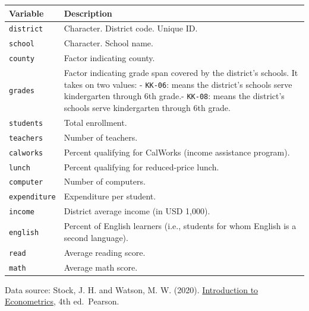 \documentclass[
  12pt,
  letterpaper,
]{scrbook}
\theoremstyle{plain}
\theoremstyle{definition}
\theoremstyle{remark}
\begin{document}
\begin{longtable}[]{@{}
  >{\raggedright\arraybackslash}p{}
  >{\raggedright\arraybackslash}p{}@{}}
\toprule\noalign{}
\begin{minipage}[b]{\linewidth}\raggedright
Variable
\end{minipage} & \begin{minipage}[b]{\linewidth}\raggedright
Description
\end{minipage} \\
\midrule\noalign{}
\endhead
\bottomrule\noalign{}
\endlastfoot
\texttt{district} & Character. District code. Unique ID. \\
\texttt{school} & Character. School name. \\
\texttt{county} & Factor indicating county. \\
\texttt{grades} & Factor indicating grade span covered by the district's
schools. It takes on two values: - \texttt{KK-06}: means the district's
schools serve kindergarten through 6th grade.- \texttt{KK-08}: means the
district's schools serve kindergarten through 6th grade. \\
\texttt{students} & Total enrollment. \\
\texttt{teachers} & Number of teachers. \\
\texttt{calworks} & Percent qualifying for CalWorks (income assistance
program). \\
\texttt{lunch} & Percent qualifying for reduced-price lunch. \\
\texttt{computer} & Number of computers. \\
\texttt{expenditure} & Expenditure per student. \\
\texttt{income} & District average income (in USD 1,000). \\
\texttt{english} & Percent of English learners (i.e., students for whom
English is a second language). \\
\texttt{read} & Average reading score. \\
\texttt{math} & Average math score. \\
\end{longtable}

Data source: Stock, J. H. and Watson, M. W. (2020).
\href{https://www.sea-stat.com/wp-content/uploads/2020/08/James-H.-Stock-Mark-W.-Watson-Introduction-to-Econometrics-Global-Edition-Pearson-Education-Limited-2020.pdf}{Introduction
to Econometrics}, 4th ed.~Pearson.
\end{document}
